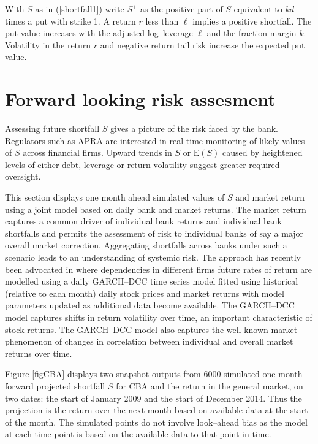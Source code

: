 \documentclass[authoryear]{elsarticle}
\newcommand{\E}{{\mathrm E}}
\newcommand{\eref}[1]{(\ref{#1})}
\newcommand{\fref}[1]{Figure \ref{#1}}
\begin{document}
With $S$  as in \eref{shortfall1} write $S^+$ as the positive part of $S$ equivalent to  $kd$ times a put with strike 1.   A return $r$ less than $\ell$ implies a positive shortfall.   The put value increases  with the adjusted log--leverage   $\ell$ and the fraction margin $k$.       Volatility in the return $r$ and negative return tail risk  increase the expected put value.

\section{Forward looking risk assesment}\label{s_forward}

Assessing future shortfall  $S$  gives a picture of the risk faced by the bank.  Regulators such as APRA are interested in real time monitoring of likely values of $S$ across  financial firms. Upward trends in $S$ or $\E(S)$ caused by heightened levels of either debt, leverage or return volatility  suggest  greater required oversight.

This section displays one month ahead simulated values of $S$ and market return  using a joint model based on daily bank and market returns.   The market return captures  a common driver of individual bank returns and individual bank shortfalls and permits the assessment of risk to individual banks of say a major overall market correction.    Aggregating shortfalls across banks  under such a scenario leads to an understanding of systemic risk.   The approach has recently been advocated in  \cite{brownlees2015} where dependencies in different firms  future rates of return  are modelled  using a daily GARCH--DCC time series model fitted using historical (relative to each month)  daily stock prices and market returns with  model parameters updated  as additional data become available.   The GARCH--DCC model  \citep{engle2002dynamic} captures shifts in return volatility over time, an important characteristic of stock returns. The GARCH--DCC model also captures the well known market phenomenon of changes in correlation between individual and overall market returns over time.

 \fref{figCBA}   displays two snapshot outputs from  6000  simulated one month forward projected shortfall $S$ for  CBA and the return in the general market, on  two dates: the start of January 2009 and the start of December 2014.  Thus the projection is the return over the next month based on available data at the start of the month. The simulated points do not involve look--ahead bias as the model at each time point is based on the available data to that point in time.
\end{document}
